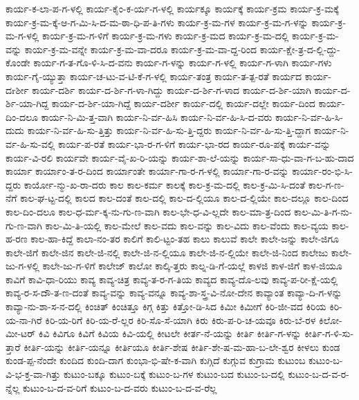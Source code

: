 {ಕಾರ್ಯ-ಕ-ಲಾ-ಪ-ಗ-ಳಲ್ಲಿ
ಕಾರ್ಯ-ಕೈಂ-ಕ-ರ್ಯ-ಗ-ಳಲ್ಲಿ
ಕಾರ್ಯಕ್ಕೂ
ಕಾರ್ಯಕ್ಕೆ
ಕಾರ್ಯ-ಕ್ರಮ
ಕಾರ್ಯ-ಕ್ರ-ಮಕ್ಕೆ
ಕಾರ್ಯ-ಕ್ರ-ಮ-ಕ್ಕೆ-ಆ-ಗ-ಮಿ-ಸಿ-ದ-ಮ-ಠಾ-ಧಿ-ಪ-ತಿ-ಗಳು
ಕಾರ್ಯ-ಕ್ರ-ಮ-ಗಳ
ಕಾರ್ಯ-ಕ್ರ-ಮ-ಗ-ಳನ್ನು
ಕಾರ್ಯ-ಕ್ರ-ಮ-ಗ-ಳಲ್ಲಿ
ಕಾರ್ಯ-ಕ್ರ-ಮ-ಗ-ಳಿಗೆ
ಕಾರ್ಯ-ಕ್ರ-ಮ-ಗಳು
ಕಾರ್ಯ-ಕ್ರ-ಮದ
ಕಾರ್ಯ-ಕ್ರ-ಮ-ದಲ್ಲಿ
ಕಾರ್ಯ-ಕ್ರ-ಮ-ವನ್ನು
ಕಾರ್ಯ-ಕ್ರ-ಮ-ವನ್ನೇ
ಕಾರ್ಯ-ಕ್ರ-ಮ-ವಾ-ದರೂ
ಕಾರ್ಯ-ಕ್ರ-ಮ-ವಾ-ದ್ದ-ರಿಂದ
ಕಾರ್ಯ-ಕ್ಷೇ-ತ್ರ-ದ-ಲ್ಲಿ-ದ್ದು-ಕೊಂಡೇ
ಕಾರ್ಯ-ಗ-ತ-ಗೊ-ಳಿ-ಸಿ-ದ-ವನು
ಕಾರ್ಯ-ಗ-ಳನ್ನು
ಕಾರ್ಯ-ಗ-ಳಲ್ಲಿ
ಕಾರ್ಯ-ಗ-ಳಾಗಿ
ಕಾರ್ಯ-ಗಳು
ಕಾರ್ಯ-ಗೈ-ಯ್ಯುತ್ತಾ
ಕಾರ್ಯ-ಚ-ಟು-ವ-ಟಿ-ಕೆ-ಗ-ಳಲ್ಲಿ
ಕಾರ್ಯ-ತಂತ್ರ
ಕಾರ್ಯ-ತ-ತ್ಪ-ರತೆ
ಕಾರ್ಯದ
ಕಾರ್ಯ-ದrರ್ಶೀ
ಕಾರ್ಯ-ದರ್ಶಿ
ಕಾರ್ಯ-ದ-ರ್ಶಿ-ಗ-ಳಾ-ಗಿದ್ದು
ಕಾರ್ಯ-ದ-ರ್ಶಿ-ಗ-ಳಾದ
ಕಾರ್ಯ-ದ-ರ್ಶಿ-ಯಾಗಿ
ಕಾರ್ಯ-ದ-ರ್ಶಿ-ಯಾ-ಗಿದ್ದ
ಕಾರ್ಯ-ದ-ರ್ಶಿ-ಯಾ-ಗಿದ್ದೆ
ಕಾರ್ಯ-ದರ್ಶೀ
ಕಾರ್ಯ-ದಲ್ಲಿ
ಕಾರ್ಯ-ದಲ್ಲೇ
ಕಾರ್ಯ-ದಿಂದ
ಕಾರ್ಯ-ದಿಂ-ದಲೂ
ಕಾರ್ಯ-ನಿ-ಮಿ-ತ್ತ-ವಾಗಿ
ಕಾರ್ಯ-ನಿ-ರ್ವ-ಹಿಸಿ
ಕಾರ್ಯ-ನಿ-ರ್ವ-ಹಿ-ಸಿ-ದ-ವರು
ಕಾರ್ಯ-ನಿ-ರ್ವ-ಹಿ-ಸಿ-ದುದು
ಕಾರ್ಯ-ನಿ-ರ್ವ-ಹಿ-ಸು-ತ್ತಿತ್ತು
ಕಾರ್ಯ-ನಿ-ರ್ವ-ಹಿ-ಸು-ತ್ತಿ-ದ್ದರು
ಕಾರ್ಯ-ನಿ-ರ್ವ-ಹಿ-ಸು-ತ್ತಿ-ದ್ದಾಗ
ಕಾರ್ಯ-ನಿ-ರ್ವ-ಹಿ-ಸು-ವಲ್ಲಿ
ಕಾರ್ಯ-ಪ-ರತೆ
ಕಾರ್ಯ-ಭಾ-ರ-ಗ-ಳಿಗೆ
ಕಾರ್ಯ-ಭಾ-ರದ
ಕಾರ್ಯ-ರೂ-ಪಕ್ಕೆ
ಕಾರ್ಯ-ವನ್ನು
ಕಾರ್ಯ-ವಿ-ರಲಿ
ಕಾರ್ಯವೇ
ಕಾರ್ಯ-ವೈ-ಖ-ರಿ-ಯನ್ನು
ಕಾರ್ಯ-ಶಾ-ಲೆ-ಯನ್ನು
ಕಾರ್ಯ-ಸಾ-ಧು-ವಾ-ಗ-ಬ-ಹು-ದಾದ
ಕಾರ್ಯಾ
ಕಾರ್ಯಾಂ-ತ-ರ-ದಿಂದ
ಕಾರ್ಯಾಂತೇ
ಕಾರ್ಯಾ-ಗಾ-ರ-ಗ-ಳಲ್ಲಿ
ಕಾರ್ಯಾ-ಗಾ-ರ-ವನ್ನು
ಕಾರ್ಯಾ-ರಂ-ಭಿ-ಸಿ-ದ್ದರು
ಕಾರ್ಯೋ-ನ್ಮು-ಖ-ರಾ-ದರು
ಕಾಲ
ಕಾಲ-ಕರ್ಮ
ಕಾಲಕ್ಕೆ
ಕಾಲ-ಕ್ರ-ಮ-ದಲ್ಲಿ
ಕಾಲ-ಕ್ರ-ಮಿ-ಸಿ-ದಂತೆ
ಕಾಲ-ಗ-ಣ-ನೆಗೆ
ಕಾಲ-ಘ-ಟ್ಟ-ದಲ್ಲಿ
ಕಾಲದ
ಕಾಲ-ದಂತೆ
ಕಾಲ-ದಲ್ಲಿ
ಕಾಲ-ದ-ಲ್ಲಿಯೂ
ಕಾಲ-ದ-ಲ್ಲಿಯೇ
ಕಾಲ-ದಲ್ಲೂ
ಕಾಲ-ದಿಂದ
ಕಾಲ-ದಿಂ-ದಲೂ
ಕಾಲ-ಧ-ರ್ಮ-ಕ್ಕ-ನು-ಗು-ಣ-ವಾಗಿ
ಕಾಲ-ಭೇ-ಧ-ವಿ-ಲ್ಲದೇ
ಕಾಲ-ಮಾ-ತ್ರ-ದಿಂದ
ಕಾಲ-ಮಿ-ತಿ-ಗ-ನು-ಗು-ಣ-ವಾಗಿ
ಕಾಲ-ಮಿ-ತಿ-ಯಲ್ಲಿ
ಕಾಲ-ಮೇಲೆ
ಕಾಲ-ವದು
ಕಾಲ-ವನ್ನು
ಕಾಲ-ವಿದು
ಕಾಲ-ವೆಂದು
ಕಾಲ-ವ್ಯಯ
ಕಾಲ-ಹ-ರಣ
ಕಾಲ-ಹಾ-ಕಿದ್ದೆ
ಕಾಲಾ-ನಂ-ತರ
ಕಾಲಿಗೆ
ಕಾಲಿ-ಟ್ಟಂ-ತಹ
ಕಾಲು
ಕಾಲುವೆ
ಕಾಲೇ
ಕಾಲೇ-ಜನ್ನು
ಕಾಲೇ-ಜಿಗೂ
ಕಾಲೇ-ಜಿಗೆ
ಕಾಲೇ-ಜಿನ
ಕಾಲೇ-ಜಿ-ನಲ್ಲಿ
ಕಾಲೇ-ಜಿ-ನ-ಲ್ಲಿಯೂ
ಕಾಲೇ-ಜಿ-ನ-ಲ್ಲಿಯೇ
ಕಾಲೇ-ಜಿ-ನಿಂದ
ಕಾಲೇಜು
ಕಾಲೇ-ಜು-ಗ-ಳಲ್ಲಿ
ಕಾಲೇ-ಜು-ಗ-ಳಿಗೆ
ಕಾಲೇಜ್
ಕಾಲೋ
ಕಾಲ್ಕಿ-ತ್ತರು
ಕಾಲ್ನ-ಡಿ-ಗೆ-ಯಲ್ಲೆ
ಕಾಳಜಿ
ಕಾಳ-ಜಿಗೆ
ಕಾಳ-ಜಿಯೂ
ಕಾವಿಗೆ
ಕಾವಿ-ಧಾ-ರಿಯು
ಕಾವ್ಯ
ಕಾವ್ಯ-ಚಿತ್ರ
ಕಾವ್ಯ-ತ-ರ-ಗ-ತಿಯ
ಕಾವ್ಯದ
ಕಾವ್ಯ-ದೊ-ಲವು
ಕಾವ್ಯ-ಪ-ರೀ-ಕ್ಷೆ-ಯಲ್ಲಿ
ಕಾವ್ಯ-ರ-ಸ-ದೌ-ತ-ಣ-ದಂತೆ
ಕಾವ್ಯ-ವನ್ನು
ಕಾವ್ಯ-ವನ್ನೂ
ಕಾವ್ಯ-ಶಾ-ಸ್ತ್ರ-ವಿ-ನೋ-ದೇನ
ಕಾವ್ಯಾಂತ
ಕಾವ್ಯಾ-ದಿ-ಗ-ಳನ್ನು
ಕಾವ್ಯಾ-ನು-ಶಾ-ಸ-ನ-ದಲ್ಲಿ
ಕಿಂಚಿತ್
ಕಿಂಚಿತ್ತೂ
ಕಿಗ್ಗ
ಕಿತ್ತು
ಕಿತ್ತೋ-ಡಿ-ಸಿದ
ಕಿಮೀ
ಕಿಮೀಗೆ
ಕಿರಿ-ಜೀ-ವದ
ಕಿರಿಯ
ಕಿರಿ-ಯ-ನಾ-ಗಿರೆ
ಕಿರಿ-ಯ-ರಿಗೆ
ಕಿರಿ-ಯ-ರೆ-ಲ್ಲರ
ಕಿರಿ-ಸೊ-ಸೆ-ಯಾಗಿ
ಕಿರು
ಕಿರು-ಪ-ರಿ-ಚ-ಯವೂ
ಕಿರು-ಬೆ-ರಳ
ಕಿಲೋ-ಮೀ-ಟರ್
ಕಿವಿ
ಕಿವಿಗೂ
ಕಿವಿಗೆ
ಕಿವಿಯ
ಕಿವಿ-ಯಲ್ಲಿ
ಕೀಟಲೇ
ಕೀರ್ತ-ನೆ-ಯನ್ನು
ಕೀರ್ತಿ
ಕೀರ್ತಿ-ಗ-ಳನ್ನು
ಕೀರ್ತಿ-ಗ-ಳಿ-ಸು-ತ್ತಾರೆ
ಕೀರ್ತಿ-ಯನ್ನು
ಕೀರ್ತಿ-ಯನ್ನೂ
ಕೀರ್ತಿಯೂ
ಕೀರ್ತಿ-ಶೇಷ
ಕೀರ್ತಿ-ಶೇ-ಷ-ಮ-ಹಾ-ಬ-ಲೇ-ಶ್ವರ
ಕೀಳಲು
ಕುಂಡ
ಕುಂಡ-ಪ್ಪ-ನೆಂದೇ
ಕುಂದಿದ
ಕುಂದಿ-ದಾಗ
ಕುಂಭಾ-ಭಿ-ಷೇ-ಕ-ವಾಗಿ
ಕುಗ್ಗಿದೆ
ಕುಗ್ಗುವ
ಕುಗ್ರಾಮ
ಕುಟುಂಬ
ಕುಟುಂ-ಬ-	ವಿ-ಭ-ಕ್ತ-ವಾ-ಗಿತ್ತು
ಕುಟುಂ-ಬಕ್ಕೂ
ಕುಟುಂ-ಬಕ್ಕೆ
ಕುಟುಂ-ಬ-ಗಳ
ಕುಟುಂ-ಬದ
ಕುಟುಂ-ಬ-ದಲ್ಲಿ
ಕುಟುಂ-ಬ-ದ-ವ-ರ-ನ್ನೆಲ್ಲ
ಕುಟುಂ-ಬ-ದ-ವ-ರಿಗೆ
ಕುಟುಂ-ಬ-ದ-ವರು
ಕುಟುಂ-ಬ-ದ-ವ-ರೆಲ್ಲ
}
